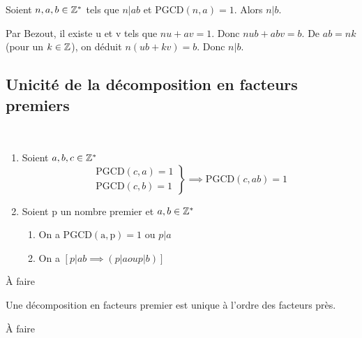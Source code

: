 \documentclass[a4paper, 12pt]{article}
\begin{document}
\begin{proposition}[Gauss]
    Soient $n, a, b \in \mathbb{Z}^*$ tels que $n | ab$ et $\mathrm{PGCD}(n, a) = 1$. Alors $n|b$.
\end{proposition}

\begin{demonstration}
    Par Bezout, il existe u et v tels que $nu + av = 1$. Donc $nub + abv = b$. De $ab = nk$ (pour un $k \in \mathbb{Z}$),
    on déduit $n(ub + kv) = b$. Donc $n | b$.
\end{demonstration}

\subsection{Unicité de la décomposition en facteurs premiers}

\begin{lemme}\
    \begin{enumerate}
        \item Soient $a, b, c \in \mathbb{Z}^*$
        \begin{equation*}
            \left.
            \begin{array}{l}
            \mathrm{PGCD}(c, a) = 1 \\
            \mathrm{PGCD}(c, b) = 1
            \end{array}
            \right\}
            \implies \mathrm{PGCD}(c, ab) = 1
        \end{equation*}
        \item Soient p un nombre premier et $a, b \in \mathbb{Z}^*$
        \begin{enumerate}
            \item On a $\mathrm{PGCD(a, p) = 1}$ ou $p | a$
            \item On a $[p|ab \implies (p|a ou p|b)]$
        \end{enumerate}
    \end{enumerate}
\end{lemme}

\begin{demonstration}
    À faire
\end{demonstration}

\begin{proposition}
    Une décomposition en facteurs premier est unique à l'ordre des facteurs près.
\end{proposition}

\begin{demonstration}
    À faire
\end{demonstration}
\end{document}
